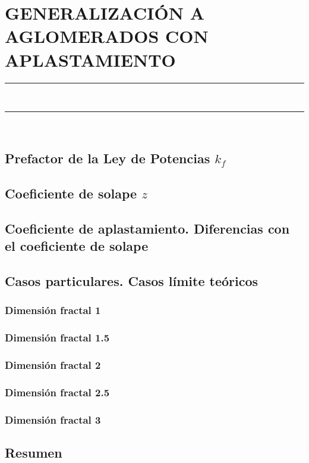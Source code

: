 \pagestyle{plain}
\chapter{GENERALIZACIÓN A AGLOMERADOS CON APLASTAMIENTO}\label{cap:Sintering}
\vspace{0.2cm}
\noindent\rule{\linewidth}{1.5pt}\\
\startcontents[chapters]
\vspace{0.2cm}
\noindent\rule{\linewidth}{1.3pt}\\
\newpage
\section{Prefactor de la Ley de Potencias $k_f$}\label{sec:PrefactorLeyPotencias}
\section{Coeficiente de solape $z$}\label{sec:CoeficienteSolape}
\section{Coeficiente de aplastamiento. Diferencias con el coeficiente de solape}\label{sec:CoeficienteAplastamiento}
\section{Casos particulares. Casos límite teóricos}\label{sec:CasosParticularesLimite}
\subsection{Dimensión fractal 1}
\subsection{Dimensión fractal 1.5}
\subsection{Dimensión fractal 2}
\subsection{Dimensión fractal 2.5}
\subsection{Dimensión fractal 3}
\section{Resumen}
\newpage
%

% 
% 


